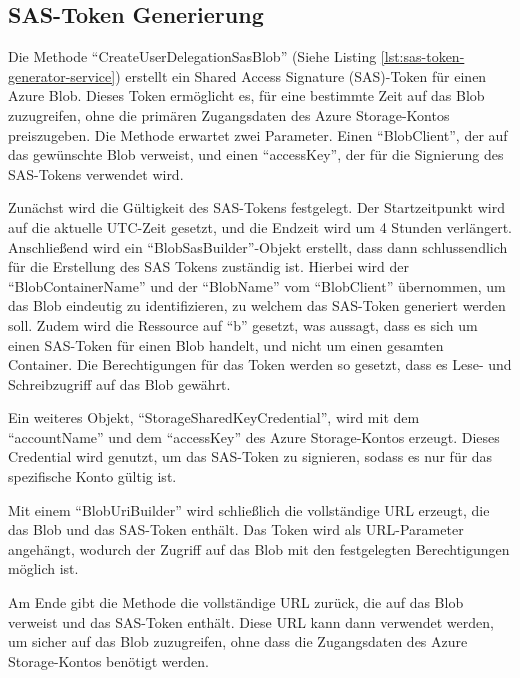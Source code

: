 \subsection{SAS-Token Generierung}
\label{subsection:sas-token-generation}

Die Methode ``CreateUserDelegationSasBlob'' (Siehe Listing \ref{lst:sas-token-generator-service}) 
erstellt ein Shared Access Signature (SAS)-Token für einen Azure Blob. Dieses Token ermöglicht 
es, für eine bestimmte Zeit auf das Blob zuzugreifen, ohne die primären Zugangsdaten des 
Azure Storage-Kontos preiszugeben. Die Methode erwartet zwei Parameter. Einen ``BlobClient'', 
der auf das gewünschte Blob verweist, und einen ``accessKey'', der für die Signierung des 
SAS-Tokens verwendet wird.

Zunächst wird die Gültigkeit des SAS-Tokens festgelegt. Der Startzeitpunkt wird auf die 
aktuelle UTC-Zeit gesetzt, und die Endzeit wird um 4 Stunden verlängert. Anschlie\ss{}end wird 
ein ``BlobSasBuilder''-Objekt erstellt, dass dann schlussendlich für die Erstellung des
SAS Tokens zuständig ist. Hierbei wird der ``BlobContainerName'' und der ``BlobName'' 
vom ``BlobClient'' übernommen, um das Blob eindeutig zu identifizieren, zu welchem das 
SAS-Token generiert werden soll. Zudem wird die Ressource auf ``b'' gesetzt, was aussagt, 
dass es sich um einen SAS-Token für einen Blob handelt, und nicht um einen gesamten Container. 
Die Berechtigungen für das Token werden so gesetzt, dass es Lese- und Schreibzugriff 
auf das Blob gewährt.

Ein weiteres Objekt, ``StorageSharedKeyCredential'', wird mit dem ``accountName'' und dem 
``accessKey'' des Azure Storage-Kontos erzeugt. Dieses Credential wird genutzt, um das 
SAS-Token zu signieren, sodass es nur für das spezifische Konto gültig ist.

Mit einem ``BlobUriBuilder'' wird schlie\ss{}lich die vollständige URL erzeugt, die das Blob 
und das SAS-Token enthält. Das Token wird als URL-Parameter angehängt, wodurch der Zugriff 
auf das Blob mit den festgelegten Berechtigungen möglich ist.

Am Ende gibt die Methode die vollständige URL zurück, die auf das Blob verweist und das 
SAS-Token enthält. Diese URL kann dann verwendet werden, um sicher auf das Blob zuzugreifen, 
ohne dass die Zugangsdaten des Azure Storage-Kontos benötigt werden.

